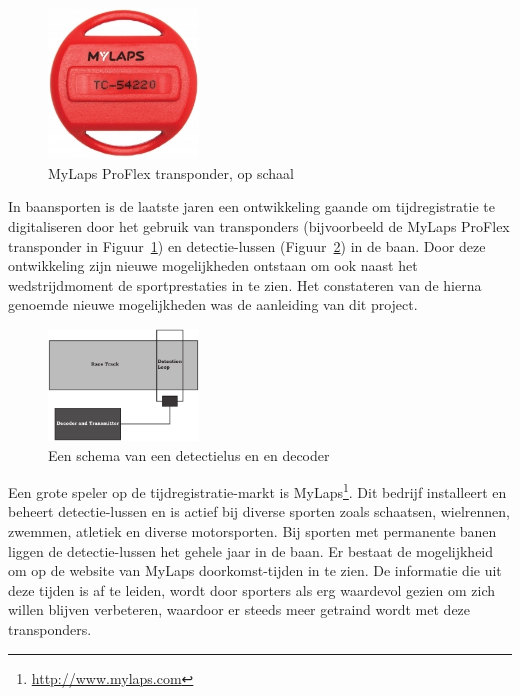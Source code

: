 \newcommand{\aanleiding}{}

\begin{figure}
  \begin{center}
    \includegraphics[width=4cm]{style/images/transponder}
  \end{center}
  \caption{MyLaps ProFlex transponder, op schaal}
  \label{fig:transponder}
  \vspace{15mm}
\end{figure}

In baansporten is de laatste jaren een ontwikkeling gaande om tijdregistratie te digitaliseren door het gebruik van transponders (bijvoorbeeld de MyLaps ProFlex transponder in Figuur~\ref{fig:transponder}) en detectie-lussen (Figuur~\ref{fig:detection-loop}) in de baan. Door deze ontwikkeling zijn nieuwe mogelijkheden ontstaan om ook naast het wedstrijdmoment de sportprestaties in te zien. Het constateren van de hierna genoemde nieuwe mogelijkheden was de aanleiding van dit project.

\begin{figure}
  \begin{center}
    \includegraphics[width=4cm]{style/images/DetectionLoop}
  \end{center}
  \caption{Een schema van een detectielus en en decoder}
  \label{fig:detection-loop}
  \vspace{5mm}
\end{figure}

Een grote speler op de tijdregistratie-markt is MyLaps\footnote{\url{http://www.mylaps.com}}. Dit bedrijf installeert en beheert detectie-lussen en is actief bij diverse sporten zoals schaatsen, wielrennen, zwemmen, atletiek en diverse motorsporten. Bij sporten met permanente banen liggen de detectie-lussen het gehele jaar in de baan. Er bestaat de mogelijkheid om op de website van MyLaps doorkomst-tijden in te zien. De informatie die uit deze tijden is af te leiden, wordt door sporters als erg waardevol gezien om zich willen blijven verbeteren, waardoor er steeds meer getraind wordt met deze transponders.

